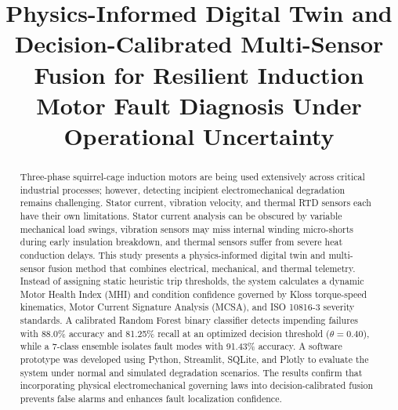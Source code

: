 \documentclass[conference]{IEEEtran}
\begin{document}
\title{Physics-Informed Digital Twin and Decision-Calibrated Multi-Sensor Fusion for Resilient Induction Motor Fault Diagnosis Under Operational Uncertainty}

\author{
\and
{}
\and
{}
\and
{}
\and
{}
}

\maketitle

\begin{abstract}
Three-phase squirrel-cage induction motors are being used extensively across critical industrial processes; however, detecting incipient electromechanical degradation remains challenging. Stator current, vibration velocity, and thermal RTD sensors each have their own limitations. Stator current analysis can be obscured by variable mechanical load swings, vibration sensors may miss internal winding micro-shorts during early insulation breakdown, and thermal sensors suffer from severe heat conduction delays. This study presents a physics-informed digital twin and multi-sensor fusion method that combines electrical, mechanical, and thermal telemetry. Instead of assigning static heuristic trip thresholds, the system calculates a dynamic Motor Health Index (MHI) and condition confidence governed by Kloss torque-speed kinematics, Motor Current Signature Analysis (MCSA), and ISO 10816-3 severity standards. A calibrated Random Forest binary classifier detects impending failures with 88.0\% accuracy and 81.25\% recall at an optimized decision threshold ($\theta = 0.40$), while a 7-class ensemble isolates fault modes with 91.43\% accuracy. A software prototype was developed using Python, Streamlit, SQLite, and Plotly to evaluate the system under normal and simulated degradation scenarios. The results confirm that incorporating physical electromechanical governing laws into decision-calibrated fusion prevents false alarms and enhances fault localization confidence.
\end{abstract}
\end{document}
